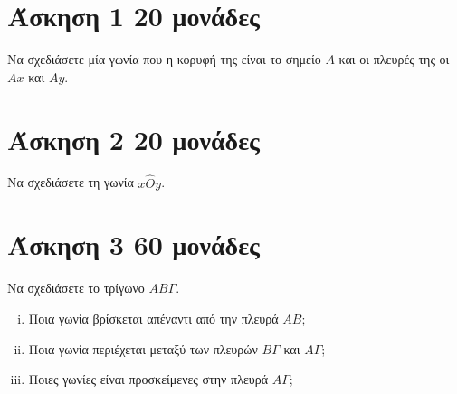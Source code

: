 \documentclass[a4paper,10pt]{report}
\begin{document}
\section*{Άσκηση 1  \hfill \small{20 μονάδες}}
Να σχεδιάσετε μία γωνία που η κορυφή της είναι το σημείο $Α$ και οι πλευρές της οι $Αx$ και $Αy$.






\section*{Άσκηση 2  \hfill \small{20 μονάδες}}
Να σχεδιάσετε τη γωνία $x\hat{O}y$.



\section*{Άσκηση 3  \hfill \small{60 μονάδες}}
Να σχεδιάσετε το τρίγωνο $ΑΒΓ$.
\begin{enumerate}[i)]
 \item Ποια γωνία βρίσκεται απέναντι από την πλευρά $ΑΒ$;
 \item Ποια γωνία περιέχεται μεταξύ των πλευρών $ΒΓ$ και $ΑΓ$;
 \item Ποιες γωνίες είναι προσκείμενες στην πλευρά $ΑΓ$;
\end{enumerate}

 









\end{document}
